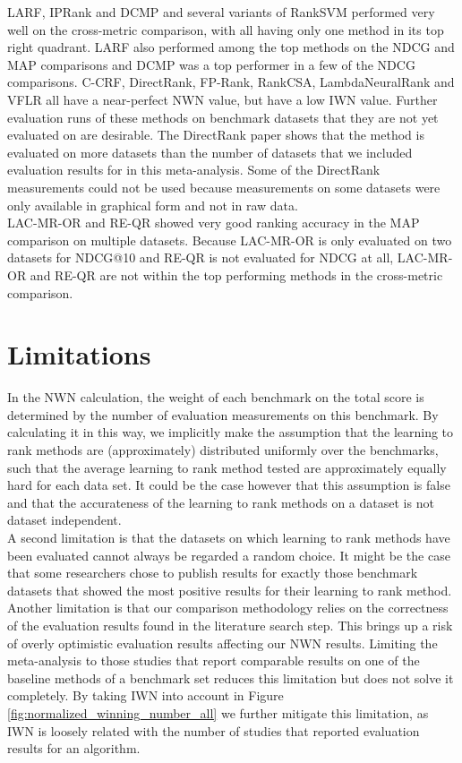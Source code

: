 \documentclass{sig-alternate}
\begin{document}
LARF, IPRank and DCMP and several variants of RankSVM performed very well on the cross-metric comparison, with all having only one method in its top right quadrant. LARF also performed among the top methods on the NDCG and MAP comparisons and DCMP was a top performer in a few of the NDCG comparisons. C-CRF, DirectRank, FP-Rank, RankCSA, LambdaNeuralRank and VFLR all have a near-perfect NWN value, but have a low IWN value. Further evaluation runs of these methods on benchmark datasets that they are not yet evaluated on are desirable. The DirectRank paper \cite{Tan2013} shows that the method  is evaluated on more datasets than the number of datasets that we included evaluation results for in this meta-analysis. Some of the DirectRank measurements could not be used because measurements on some datasets were only available in graphical form and not in raw data.\\

LAC-MR-OR and RE-QR showed very good ranking accuracy in the MAP comparison on multiple datasets. Because LAC-MR-OR is only evaluated on two datasets for NDCG@10 and RE-QR is not evaluated for NDCG at all, LAC-MR-OR and RE-QR are not within the top performing methods in the cross-metric comparison. 

\section{Limitations}
In the NWN calculation, the weight of each benchmark on the total score is determined by the number of evaluation measurements on this benchmark. By calculating it in this way, we implicitly make the assumption that the learning to rank methods are (approximately) distributed uniformly over the benchmarks, such that the average learning to rank method tested are approximately equally hard for each data set. It could be the case however that this assumption is false and that the accurateness of the learning to rank methods on a dataset is not dataset independent.\\

A second limitation is that the datasets on which learning to rank methods have been evaluated cannot always be regarded a random choice. It might be the case that some researchers chose to publish results for exactly those benchmark datasets that showed the most positive results for their learning to rank method.\\

Another limitation is that our comparison methodology relies on the correctness of the evaluation results found in the literature search step. This brings up a risk of overly optimistic evaluation results affecting our NWN results. Limiting the meta-analysis to those studies that report comparable results on one of the baseline methods of a benchmark set reduces this limitation but does not solve it completely. By taking IWN into account in Figure \ref{fig:normalized_winning_number_all} we further mitigate this limitation, as IWN is loosely related with the number of studies that reported evaluation results for an algorithm.\\
\end{document}
